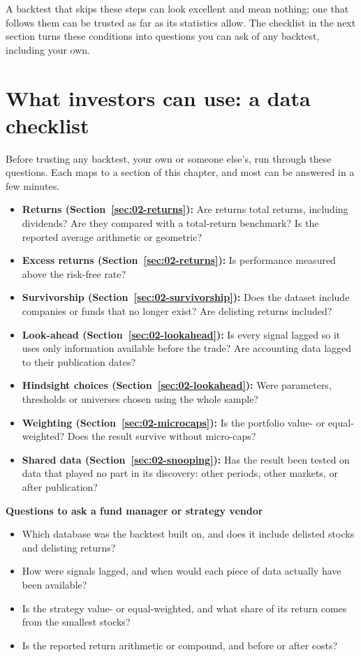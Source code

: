 A backtest that skips these steps can look excellent and mean nothing; one that follows them can be trusted as far as its statistics allow. The checklist in the next section turns these conditions into questions you can ask of any backtest, including your own.

\section{What investors can use: a data checklist}
\label{sec:02-checklist}

Before trusting any backtest, your own or someone else's, run through these questions. Each maps to a section of this chapter, and most can be answered in a few minutes.

\begin{itemize}
  \item[$\square$] \textbf{Returns (Section~\ref{sec:02-returns}):} Are returns total returns, including dividends? Are they compared with a total-return benchmark? Is the reported average arithmetic or geometric?
  \item[$\square$] \textbf{Excess returns (Section~\ref{sec:02-returns}):} Is performance measured above the risk-free rate?
  \item[$\square$] \textbf{Survivorship (Section~\ref{sec:02-survivorship}):} Does the dataset include companies or funds that no longer exist? Are delisting returns included?
  \item[$\square$] \textbf{Look-ahead (Section~\ref{sec:02-lookahead}):} Is every signal lagged so it uses only information available before the trade? Are accounting data lagged to their publication dates?
  \item[$\square$] \textbf{Hindsight choices (Section~\ref{sec:02-lookahead}):} Were parameters, thresholds or universes chosen using the whole sample?
  \item[$\square$] \textbf{Weighting (Section~\ref{sec:02-microcaps}):} Is the portfolio value- or equal-weighted? Does the result survive without micro-caps?
  \item[$\square$] \textbf{Shared data (Section~\ref{sec:02-snooping}):} Has the result been tested on data that played no part in its discovery: other periods, other markets, or after publication?
\end{itemize}

\textbf{Questions to ask a fund manager or strategy vendor}

\begin{itemize}
  \item Which database was the backtest built on, and does it include delisted stocks and delisting returns?
  \item How were signals lagged, and when would each piece of data actually have been available?
  \item Is the strategy value- or equal-weighted, and what share of its return comes from the smallest stocks?
  \item Is the reported return arithmetic or compound, and before or after costs?
\end{itemize}


